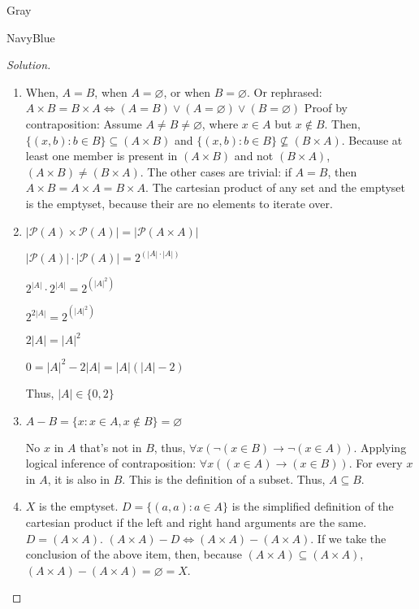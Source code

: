\documentclass[12pt]{amsart}
\theoremstyle{named}
\newenvironment{soln}
{\begin{color}{Gray}\begin{framed}\begin{color}{NavyBlue}\begin{proof}[Solution]
\doublespacing}
{\end{proof}\end{color}\end{framed}\end{color}}
\theoremstyle{definition}
\begin{document}
\begin{soln} 
    \phantom{ }
    \begin{enumerate}
        \item When, $A = B$, when $A = \varnothing$, or when $B = \varnothing$.
        Or rephrased: $A\times B = B\times A \iff  (A = B) \lor (A =
        \varnothing) \lor (B = \varnothing)$ Proof by contraposition: Assume $A
        \neq B \neq \varnothing$, where $ x \in A $ but $x \notin B$. Then,
        $\{(x,b) : b \in B \} \subseteq (A \times B)$ and  $\{(x,b) : b \in B \}
        \nsubseteq (B \times A)$. Because at least one member is present in $(A
        \times B)$ and not $(B \times A)$, $(A \times B) \neq (B \times A)$. The
        other cases are trivial: if $A = B$, then $A \times B = A \times A = B
        \times A$. The cartesian product of any set and the emptyset is the
        emptyset, because their are no elements to iterate over. 
        \item $|\mathscr P(A)\times\mathscr P(A)| = |\mathscr P(A\times A)|$ 
        
        \noindent$|\mathscr P(A)| \cdot |\mathscr P(A)| = 2^{(|A| \cdot |A|)}$

        \noindent$2^{|A|} \cdot 2^{|A|} = 2^{(|A|^{2})}$

        \noindent$2^{2|A|} = 2^{(|A|^{2})}$

        \noindent$2|A| = |A|^2$

        \noindent$0 = |A|^2 - 2|A| = |A|(|A| - 2)$


        
        \noindent Thus, $|A| \in \{0,2\}$

        \item $ A - B = \{x : x \in A, x \notin B\} = \varnothing$
        
        No $x$ in $A$ that's not in $B$, thus, $\forall x(\lnot(x \in B)
        \rightarrow \lnot(x \in A))$. Applying logical inference of
        contraposition: $\forall x((x \in A) \rightarrow (x \in B))$. For every
        $x$ in $A$, it is also in $B$. This is the definition of a subset. Thus,
        $A \subseteq B$. 

        \item $X$ is the emptyset. $D = \{(a,a) : a \in A\}$ is the simplified
        definition of the cartesian product if the left and right hand arguments
        are the same. $D = (A \times A)$. $(A \times A) - D \iff (A \times A) -
        (A \times A)$. If we take the conclusion of the above item, then,
        because  $(A \times A) \subseteq (A \times A)$, $(A \times A) - (A
        \times A) = \varnothing = X$.
    \end{enumerate}
	
\end{soln}
\end{document}

